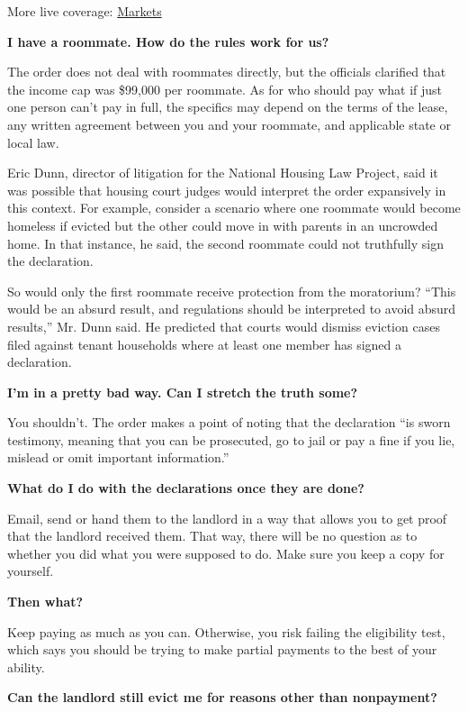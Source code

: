 More live coverage:
\href{https://www.nytimes3xbfgragh.onion/live/2020/09/04/business/stock-market-today-coronavirus?action=click\&pgtype=Article\&state=default\&region=MAIN_CONTENT_1\&context=storylines_live_updates}{Markets}

\textbf{I have a roommate. How do the rules work for us?}

The order does not deal with roommates directly, but the officials
clarified that the income cap was \$99,000 per roommate. As for who
should pay what if just one person can't pay in full, the specifics may
depend on the terms of the lease, any written agreement between you and
your roommate, and applicable state or local law.

Eric Dunn, director of litigation for the National Housing Law Project,
said it was possible that housing court judges would interpret the order
expansively in this context. For example, consider a scenario where one
roommate would become homeless if evicted but the other could move in
with parents in an uncrowded home. In that instance, he said, the second
roommate could not truthfully sign the declaration.

So would only the first roommate receive protection from the moratorium?
``This would be an absurd result, and regulations should be interpreted
to avoid absurd results,'' Mr. Dunn said. He predicted that courts would
dismiss eviction cases filed against tenant households where at least
one member has signed a declaration.

\textbf{I'm in a pretty bad way. Can I stretch the truth some?}

You shouldn't. The order makes a point of noting that the declaration
``is sworn testimony, meaning that you can be prosecuted, go to jail or
pay a fine if you lie, mislead or omit important information.''

\textbf{What do I do with the declarations once they are done?}

Email, send or hand them to the landlord in a way that allows you to get
proof that the landlord received them. That way, there will be no
question as to whether you did what you were supposed to do. Make sure
you keep a copy for yourself.

\textbf{Then what?}

Keep paying as much as you can. Otherwise, you risk failing the
eligibility test, which says you should be trying to make partial
payments to the best of your ability.

\textbf{Can the landlord still evict me for reasons other than
nonpayment?}

